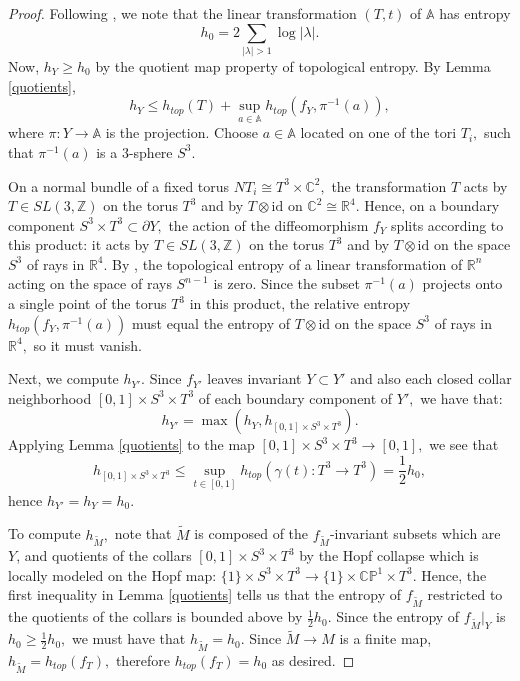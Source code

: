 \documentclass{amsart}
\theoremstyle{theorem}
\theoremstyle{definition}
\theoremstyle{definition}
\theoremstyle{definition}
\theoremstyle{theorem}
\theoremstyle{theorem}
\theoremstyle{theorem}
\theoremstyle{corollary}
\theoremstyle{question}
\theoremstyle{remark}
\begin{document}
\begin{proof}

Following \cite[Section 3.2]{FL}, we note that the linear transformation $(T, t)$ of $\mathbb{A}$ has entropy $$h_0=2\sum_{|\lambda|>1}\log |\lambda|.$$ Now, $h_Y\geq h_0$ by the quotient map property of topological entropy. By Lemma \ref{quotients}, $$h_Y\leq h_{top}(T)+\sup_{a\in\mathbb{A}} h_{top}(f_Y, \pi^{-1}(a)),$$ where $\pi:Y\to\mathbb{A}$ is the projection. Choose $a \in \mathbb{A}$ located on one of the tori $T_i,$ such that $\pi^{-1}(a)$ is a 3-sphere $S^3.$

On a normal bundle of a fixed torus $NT_i\cong T^3\times \mathbb{C}^2,$ the transformation $T$ acts by $T\in SL(3,\mathbb{Z})$ on the torus $T^3$ and by $T\otimes\text{id}$ on $\mathbb{C}^2\cong\mathbb{R}^4.$ Hence, on a boundary component $S^3\times T^3\subset\partial Y,$ the action of the diffeomorphism $f_Y$ splits according to this product: it acts by $T\in SL(3,\mathbb{Z})$ on the torus $T^3$ and by $T\otimes\text{id}$ on the space $S^3$ of rays in $\mathbb{R}^4.$ By \cite[Proposition 3.6]{FL}, the topological entropy of a linear transformation of $\mathbb{R}^n$ acting on the space of rays $S^{n-1}$ is zero. Since the subset $\pi^{-1}(a)$ projects onto a single point of the torus $T^3$ in this product, the relative entropy $h_{top}(f_Y, \pi^{-1}(a))$ must equal the entropy of $T\otimes\text{id}$ on the space $S^3$ of rays in $\mathbb{R}^4,$ so it must vanish.

Next, we compute $h_{Y'}.$ Since $f_{Y'}$ leaves invariant $Y\subset Y'$ and also each closed collar neighborhood $[0,1]\times S^3\times T^3$ of each boundary component of $Y',$ we have that: $$h_{Y'} = \max( h_Y, h_{[0,1]\times S^3\times T^3}).$$ Applying Lemma \ref{quotients} to the map $[0,1]\times S^3\times T^3\to[0,1],$ we see that $$h_{[0,1]\times S^3\times T^3}\leq \sup_{t\in [0,1]} h_{top}(\gamma(t):T^3\to T^3)=\frac12 h_0,$$ hence $h_{Y'} = h_Y = h_0.$

To compute $h_{\tilde{M}},$ note that $\tilde{M}$ is composed of the $f_{\tilde{M}}$-invariant subsets which are $Y$, and quotients of the collars $[0,1]\times S^3\times T^3$ by the Hopf collapse which is locally modeled on the Hopf map: $\{1\}\times S^3\times T^3\to \{1\}\times \mathbb{CP}^1\times T^3.$ Hence, the first inequality in Lemma \ref{quotients} tells us that the entropy of $f_{\tilde{M}}$ restricted to the quotients of the collars is bounded above by $\frac12 h_0.$ Since the entropy of $f_{\tilde{M}}|_Y$ is $h_0\geq \frac12 h_0,$ we must have that $h_{\tilde{M}} = h_0.$ Since $\tilde{M}\to M$ is a finite map, $h_{\tilde{M}}=h_{top}(f_T),$ therefore $h_{top}(f_T) = h_0$ as desired.
\end{proof}
\end{document}

